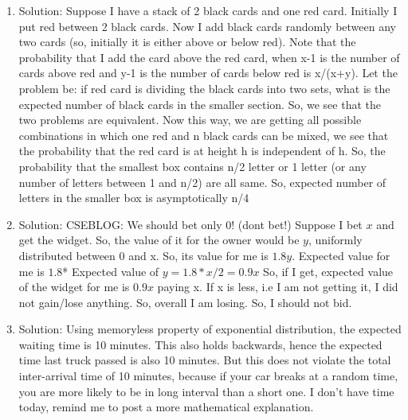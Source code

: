 \begin{enumerate}
\item
Solution: Suppose I have a stack of 2 black cards and one red card. Initially I put red between 2 black cards. Now I add black cards randomly between any two cards (so, initially it is either above or below red). Note that the probability that I add the card above the red card, when x-1 is the number of cards above red and y-1 is the number of cards below red is x/(x+y). Let the problem be: if red card is dividing the black cards into two sets, what is the expected number of black cards in the smaller section. So, we see that the two problems are equivalent.
Now this way, we are getting all possible combinations in which one red and n black cards can be mixed, we see that the probability that the red card is at height h is independent of h. So, the probability that the smallest box contains n/2 letter or 1 letter (or any number of letters between 1 and n/2) are all same. So, expected number of letters in the smaller box is asymptotically n/4




\item
Solution: CSEBLOG: We should bet only 0! (dont bet!) Suppose I bet $x$ and get the widget. So, the value of it for the owner would be $y$, uniformly distributed between 0 and x. So, its value for me is $1.8y$. Expected value for me is $1.8$* Expected value of $y = 1.8*x/2= 0.9x$
So, if I get, expected value of the widget for me is $0.9x $ paying x.
If x is less, i.e I am not getting it, I did not gain/lose anything.
So, overall I am losing. So, I should not bid.




\item
Solution: Using memoryless property of exponential distribution, the expected waiting time is 10 minutes. This also holds backwards, hence the expected time last truck passed is also 10 minutes. But this does not violate the total inter-arrival time of 10 minutes, because if your car breaks at a random time, you are more likely to be in long interval than a short one. I don't have time today, remind me to post a more mathematical explanation.




\end{enumerate}
